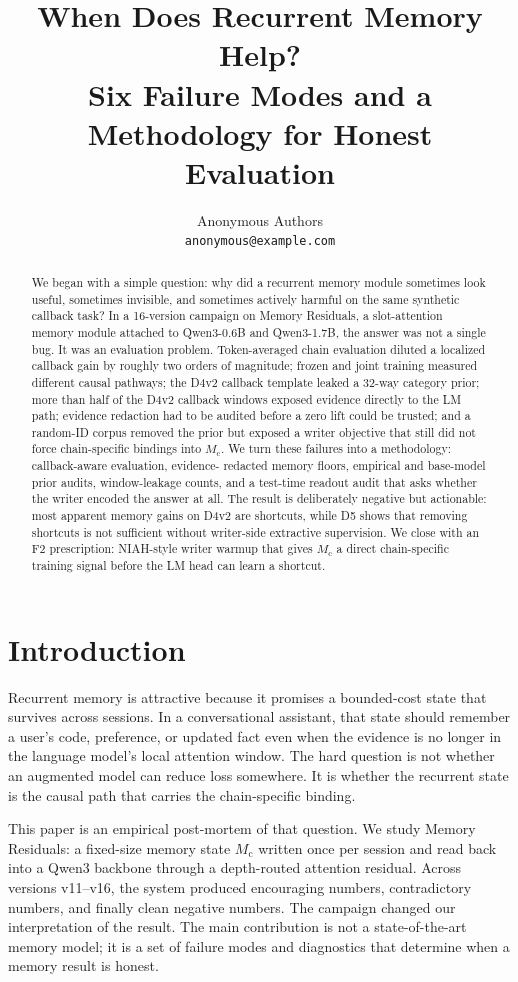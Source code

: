\documentclass{article}
\title{When Does Recurrent Memory Help?\\Six Failure Modes and a Methodology for Honest Evaluation}
\author{%
  Anonymous Authors\\
  \texttt{anonymous@example.com}
}
\newcommand{\Mc}{M_{\mathrm{c}}}
\begin{document}
\maketitle

\begin{abstract}
We began with a simple question: why did a recurrent memory module
sometimes look useful, sometimes invisible, and sometimes actively
harmful on the same synthetic callback task?  In a 16-version campaign
on Memory Residuals, a slot-attention memory module attached to
Qwen3-0.6B and Qwen3-1.7B, the answer was not a single bug.  It was an
evaluation problem.  Token-averaged chain evaluation diluted a
localized callback gain by roughly two orders of magnitude; frozen and
joint training measured different causal pathways; the D4v2 callback
template leaked a 32-way category prior; more than half of the D4v2
callback windows exposed evidence directly to the LM path; evidence
redaction had to be audited before a zero lift could be trusted; and a
random-ID corpus removed the prior but exposed a writer objective that
still did not force chain-specific bindings into $\Mc$.  We turn these
failures into a methodology: callback-aware evaluation, evidence-
redacted memory floors, empirical and base-model prior audits,
window-leakage counts, and a test-time readout audit that asks whether
the writer encoded the answer at all.  The result is deliberately
negative but actionable: most apparent memory gains on D4v2 are
shortcuts, while D5 shows that removing shortcuts is not sufficient
without writer-side extractive supervision.  We close with an F2
prescription: NIAH-style writer warmup that gives $\Mc$ a direct
chain-specific training signal before the LM head can learn a shortcut.
\end{abstract}

\section{Introduction}

Recurrent memory is attractive because it promises a bounded-cost state
that survives across sessions.  In a conversational assistant, that
state should remember a user's code, preference, or updated fact even
when the evidence is no longer in the language model's local attention
window.  The hard question is not whether an augmented model can reduce
loss somewhere.  It is whether the recurrent state is the causal path
that carries the chain-specific binding.

This paper is an empirical post-mortem of that question.  We study
Memory Residuals: a fixed-size memory state $\Mc$ written once per
session and read back into a Qwen3 backbone through a depth-routed
attention residual.  Across versions v11--v16, the system produced
encouraging numbers, contradictory numbers, and finally clean negative
numbers.  The campaign changed our interpretation of the result.  The
main contribution is not a state-of-the-art memory model; it is a set of
failure modes and diagnostics that determine when a memory result is
honest.
\end{document}
